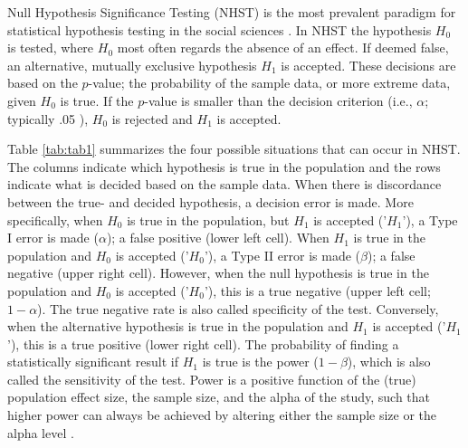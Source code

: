 \documentclass{article}
\begin{document}
Null Hypothesis Significance Testing (NHST) is the most prevalent paradigm for statistical hypothesis testing in the social sciences \cite{American_Psychological_Association2010-qe}. In NHST the hypothesis $H_0$ is tested, where $H_0$ most often regards the absence of an effect. If deemed false, an alternative, mutually exclusive hypothesis $H_1$ is accepted. These decisions are based on the $p$-value; the probability of the sample data, or more extreme data, given $H_0$ is true. If the $p$-value is smaller than the decision criterion (i.e., $\alpha$; typically .05 \cite{Nuijten2015-od}), $H_0$ is rejected and $H_1$ is accepted.

Table \ref{tab:tab1} summarizes the four possible situations that can occur in NHST. The columns indicate which hypothesis is true in the population and the rows indicate what is decided based on the sample data. When there is discordance between the true- and decided hypothesis, a decision error is made. More specifically, when $H_0$ is true in the population, but $H_1$ is accepted ('$H_1$'), a Type I error is made ($\alpha$); a false positive (lower left cell). When $H_1$ is true in the population and $H_0$ is accepted ('$H_0$'), a Type II error is made ($\beta$); a false negative (upper right cell). However, when the null hypothesis is true in the population and $H_0$ is accepted ('$H_0$'), this is a true negative (upper left cell; $1-\alpha$). The true negative rate is also called specificity of the test. Conversely, when the alternative hypothesis is true in the population and $H_1$ is accepted ('$H_1$'), this is a true positive (lower right cell). The probability of finding a statistically significant result if $H_1$ is true is the power ($1-\beta$), which is also called the sensitivity of the test. Power is a positive function of the (true) population effect size, the sample size, and the alpha of the study, such that higher power can always be achieved by altering either the sample size or the alpha level \cite{Aberson2010-xa}. 
\end{document}
